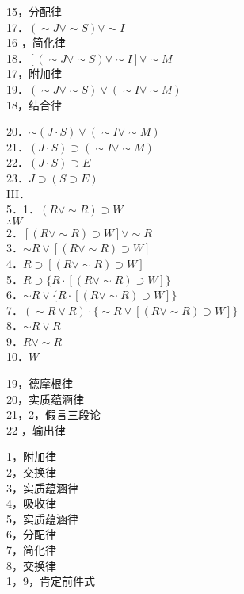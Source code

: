15，分配律\\
17．$(\sim J \vee \sim S) \vee \sim I$\\
16 ，简化律\\
18．$[(\sim J \vee \sim S) \vee \sim I] \vee \sim M$\\
17，附加律\\
19．$(\sim J \vee \sim S) \vee(\sim I \vee \sim M)$\\
18，结合律

20．$\sim(J \cdot S) \vee(\sim I \vee \sim M)$\\
21．$(J \cdot S) \supset(\sim I \vee \sim M)$\\
22．$(J \cdot S) \supset E$\\
23．$J \supset(S \supset E)$\\
III．\\
5．1．$(R \vee \sim R) \supset W$\\
$\therefore W$\\
2．$[(R \vee \sim R) \supset W] \vee \sim R$\\
3．$\sim R \vee[(R \vee \sim R) \supset W]$\\
4．$R \supset[(R \vee \sim R) \supset W]$\\
5．$R \supset\{R \cdot[(R \vee \sim R) \supset W]\}$\\
6．$\sim R \vee\{R \cdot[(R \vee \sim R) \supset W]\}$\\
7．$(\sim R \vee R) \cdot\{\sim R \vee[(R \vee \sim R) \supset W]\}$\\
8．$\sim R \vee R$\\
9．$R \vee \sim R$\\
10．$W$

19，德摩根律\\
20，实质蕴涵律\\
21，2，假言三段论\\
22 ，输出律

1，附加律\\
2，交换律\\
3，实质蕴涵律\\
4，吸收律\\
5，实质蕴涵律\\
6，分配律\\
7，简化律\\
8，交换律\\
1，9，肯定前件式

